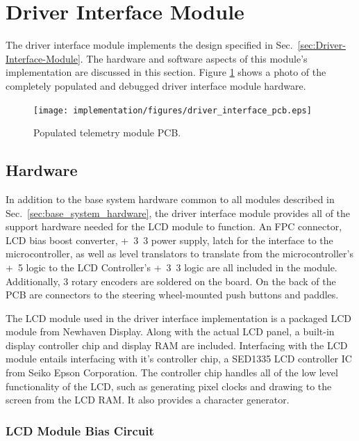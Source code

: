 \section{Driver Interface Module}

The driver interface module implements the design specified in Sec.\ \ref{sec:Driver-Interface-Module}. The hardware and software aspects of this module's implementation are discussed in this section. Figure \ref{fig:driver_interface_pcb} shows a photo of the completely populated and debugged driver interface module hardware.

\begin{figure}[h]
\centering
\texttt{[image: implementation/figures/driver\_interface\_pcb.eps]}
\caption{Populated telemetry module PCB.}\label{fig:driver_interface_pcb}
\end{figure}

\subsection{Hardware}

In addition to the base system hardware common to all modules described in Sec.\ \ref{sec:base_system_hardware}, the driver interface module provides all of the support hardware needed for the LCD module to function. An FPC connector, LCD bias boost converter, \unit{+3.3}{\volt} power supply, latch for the interface to the microcontroller, as well as level translators to translate from the microcontroller's \unit{+5}{\volt} logic to the LCD Controller's \unit{+3.3}{\volt} logic are all included in the module. Additionally, 3 rotary encoders are soldered on the board. On the back of the PCB are connectors to the steering wheel-mounted push buttons and paddles.

The LCD module used in the driver interface implementation is a packaged LCD module from Newhaven Display. Along with the actual LCD panel, a built-in display controller chip and display RAM are included. Interfacing with the LCD module entails interfacing with it's controller chip, a SED1335 LCD controller IC from Seiko Epson Corporation. The controller chip handles all of the low level functionality of the LCD, such as generating pixel clocks and drawing to the screen from the LCD RAM. It also provides a character generator.

\subsubsection{LCD Module Bias Circuit}

